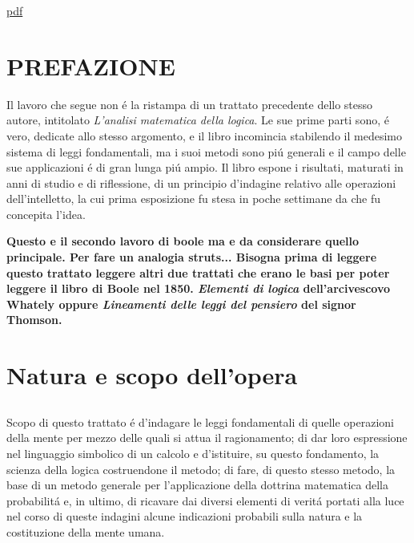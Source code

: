 \documentclass[a4paper,10pt]{book}
\begin{document}
\href{IndagineLeggiPensiero.pdf}{pdf}
\chapter*{PREFAZIONE}
Il lavoro che segue non \'{e} la ristampa di un trattato precedente dello stesso autore, intitolato \textit{L'analisi matematica della logica}. Le sue prime parti sono, \'{e} vero,
dedicate allo stesso argomento, e il libro incomincia stabilendo il medesimo sistema di leggi fondamentali, ma i suoi metodi sono pi\'{u} generali e il campo delle sue applicazioni
\'{e} di gran lunga pi\'{u} ampio. Il libro espone i risultati, maturati in anni di studio e di riflessione, di un principio d'indagine relativo alle operazioni dell'intelletto, la cui
prima esposizione fu stesa in poche settimane da che fu concepita l'idea.

\textbf{Questo e il secondo lavoro di boole ma e da considerare quello principale. Per fare un analogia struts... Bisogna prima di leggere questo trattato
  leggere altri due trattati che erano le basi per poter leggere il libro di Boole nel 1850.  
  \textit{Elementi di logica} dell'arcivescovo Whately oppure \textit{Lineamenti delle leggi del pensiero} del signor Thomson.
}

\chapter{Natura e scopo dell'opera}
\section{}
Scopo di questo trattato \'{e} d'indagare le leggi fondamentali di quelle operazioni della mente per mezzo delle quali si attua il ragionamento; di dar loro espressione nel linguaggio
simbolico di un calcolo e d'istituire, su questo fondamento, la scienza della logica costruendone il metodo; di fare, di questo stesso metodo, la base di un metodo generale per
l'applicazione della dottrina matematica della probabilit\'{a} e, in ultimo, di ricavare dai diversi elementi di verit\'{a} portati alla luce nel corso di queste indagini alcune
indicazioni probabili sulla natura e la costituzione della mente umana.
\end{document}
